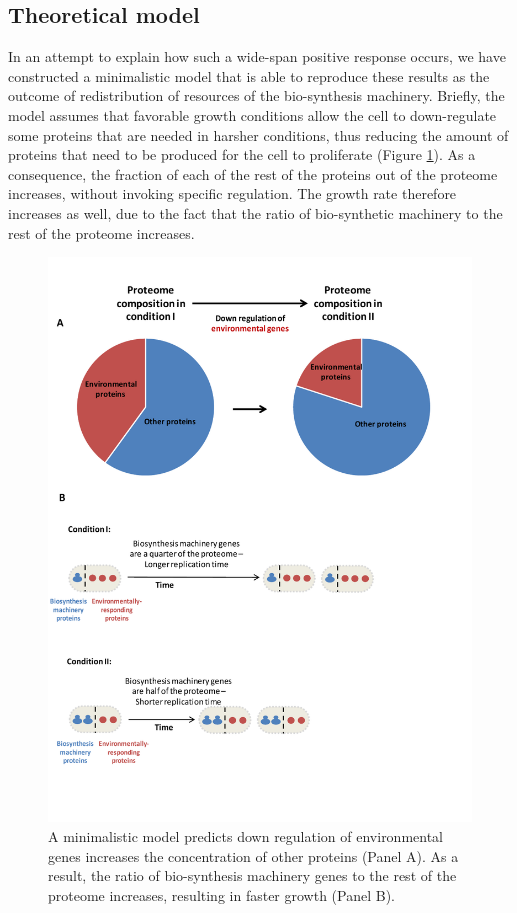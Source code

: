 \documentclass[a4paper,landscape,17pt]{extarticle}
\begin{document}
\clearpage        
\subsection*{Theoretical model}
In an attempt to explain how such a wide-span positive response occurs, we have constructed a minimalistic model that is able to reproduce these results as the outcome of redistribution of resources of the bio-synthesis machinery.
Briefly, the model assumes that favorable growth conditions allow the cell to down-regulate some proteins that are needed in harsher conditions, thus reducing the amount of proteins that need to be produced for the cell to proliferate (Figure \ref{fig:model}).
As a consequence, the fraction of each of the rest of the proteins out of the proteome increases, without invoking specific regulation.
The growth rate therefore increases as well, due to the fact that the ratio of bio-synthetic machinery to the rest of the proteome increases.

\clearpage
\begin{landscape}
\begin{figure}[h]
\centering
\includegraphics[scale=0.9]{Figures7-trieste.pdf}
\caption{\linespread{0.5}\selectfont{}
  A minimalistic model predicts down regulation of environmental genes increases the concentration of other proteins (Panel A).
As a result, the ratio of bio-synthesis machinery genes to the rest of the proteome increases, resulting in faster growth (Panel B).
}
\label{fig:model}
\end{figure}
\end{landscape}
\clearpage        


\printbibliography
\end{document}
